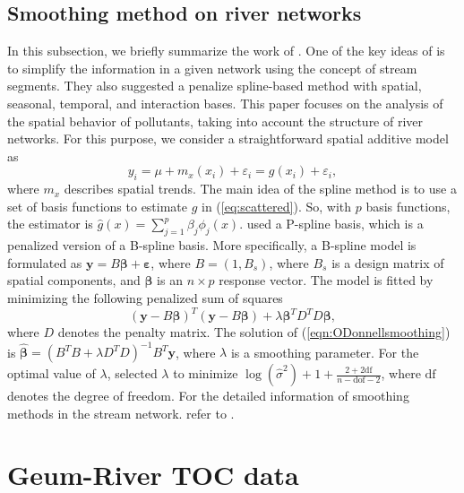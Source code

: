 \documentclass[11pt,titlepage]{article}
\begin{document}
\subsection{Smoothing method on river networks}
In this subsection, we briefly summarize the work of \cite{ODonnell2014}. One of the key ideas of \cite{ODonnell2014} is to simplify the information in a given network using the concept of stream segments. They also suggested a penalize spline-based method with spatial, seasonal, temporal, and interaction bases. This paper focuses on the analysis of the spatial behavior of pollutants, taking into account the structure of river networks. For this purpose, we consider a straightforward spatial additive model as 
\begin{equation}\label{eqn:spatialsimpleadditive}
y_{i} = \mu + m_{x}(x_i) + \varepsilon_{i} = g(x_i) + \varepsilon_{i},
\end{equation}
where $m_x$ describes spatial trends. The main idea of the spline method is to use a set of basis functions to estimate $g$ in  (\ref{eq:scattered}). So, with $p$ basis functions, the estimator is $\hat{g}(x) = \sum_{j=1}^{p}\beta_{j} \phi_{j}(x)$. \cite{ODonnell2014} used a P-spline basis, which is a penalized version of a B-spline basis. More specifically, a B-spline model is formulated as $\mathbf{y}=B\boldsymbol{\beta} +\boldsymbol{\varepsilon}$, where $B= (1, B_s)$, where $B_{s}$ is a design matrix of spatial components, and $\boldsymbol{\beta}$ is an $n\times p$ response vector. The model is fitted by minimizing the following penalized sum of squares
\begin{equation}\label{eqn:ODonnellsmoothing}
(\mathbf{y}-B\boldsymbol{\beta})^{T}(\mathbf{y}-B\boldsymbol{\beta}) + \lambda\boldsymbol{\beta}^{T}D^{T}D\boldsymbol{\beta},
\end{equation} 
where $D$ denotes the penalty matrix. The solution of (\ref{eqn:ODonnellsmoothing}) is $\hat{\boldsymbol{\beta}} = (B^{T}B+ \lambda D^{T} D)^{-1}B^{T}\mathbf{y}$, where $\lambda$ is a smoothing parameter. For the optimal value of $\lambda$, \cite{ODonnell2014} selected $\lambda$ to minimize $\log(\hat{\sigma}^{2}) + 1 + \frac{2+2\text{df}}{n-\text{dof}-2}$, where $\text{df}$ denotes the degree of freedom. For the detailed information of smoothing methods in the stream network. refer to \cite{ODonnell2014}. 


\section{Geum-River TOC data}\label{sec:data}
\end{document}
